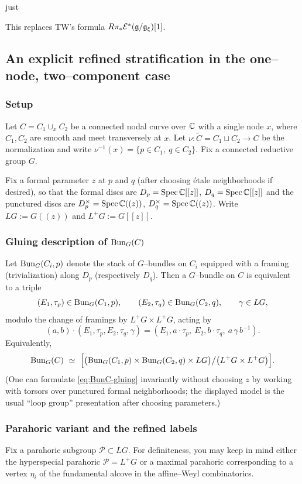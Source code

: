 just \documentclass[12pt]{article}
\begin{document}
This replaces TW’s formula \(R\pi_*\mathcal E^*(\mathfrak{g}/\mathfrak{g}_\xi)[1]\).

\subsection{An explicit refined stratification in the one--node, two--component case}

\subsubsection*{Setup}
Let $C=C_1\cup_x C_2$ be a connected nodal curve over $\mathbb{C}$ with a single node $x$,
where $C_1,C_2$ are smooth and meet transversely at $x$.
Let $\nu:\widetilde C=C_1\sqcup C_2\to C$ be the normalization and write
$\nu^{-1}(x)=\{p\in C_1,\ q\in C_2\}$.
Fix a connected reductive group $G$.

Fix a formal parameter $z$ at $p$ and $q$ (after choosing étale neighborhoods if desired),
so that the formal discs are $D_p=\operatorname{Spec}\mathbb{C}[[z]]$, $D_q=\operatorname{Spec}\mathbb{C}[[z]]$ and the punctured discs
are $D_p^\times=\operatorname{Spec}\mathbb{C}((z))$, $D_q^\times=\operatorname{Spec}\mathbb{C}((z))$.
Write $LG:=G((z))$ and $L^+G:=G[[z]]$.

\subsubsection*{Gluing description of $\operatorname{Bun}_G(C)$}
Let $\operatorname{Bun}_G(C_i,p)$ denote the stack of $G$--bundles on $C_i$ equipped with a framing
(trivialization) along $D_p$ (respectively $D_q$).
Then a $G$--bundle on $C$ is equivalent to a triple
\[
(E_1,\tau_p)\in \operatorname{Bun}_G(C_1,p),\qquad (E_2,\tau_q)\in \operatorname{Bun}_G(C_2,q),\qquad
\gamma\in LG,
\]
modulo the change of framings by $L^+G\times L^+G$, acting by
\[
(a,b)\cdot (E_1,\tau_p,E_2,\tau_q,\gamma)
=
(E_1,a\cdot\tau_p,\ E_2,b\cdot\tau_q,\ a\,\gamma\,b^{-1}).
\]
Equivalently,
\begin{equation}
\label{eq:BunC-gluing}
\operatorname{Bun}_G(C)\ \simeq\
\Bigl[\bigl(\operatorname{Bun}_G(C_1,p)\times \operatorname{Bun}_G(C_2,q)\times LG\bigr)\big/\bigl(L^+G\times L^+G\bigr)\Bigr].
\end{equation}
(One can formulate \eqref{eq:BunC-gluing} invariantly without choosing $z$ by working with
torsors over punctured formal neighborhoods; the displayed model is the usual ``loop group''
presentation after choosing parameters.)

\subsubsection*{Parahoric variant and the refined labels}
Fix a parahoric subgroup $\mathcal P\subset LG$.
For definiteness, you may keep in mind either the hyperspecial parahoric
$\mathcal P=L^+G$ or a maximal parahoric corresponding to a vertex $\eta_i$ of the
fundamental alcove in the affine--Weyl combinatorics.
\end{document}
